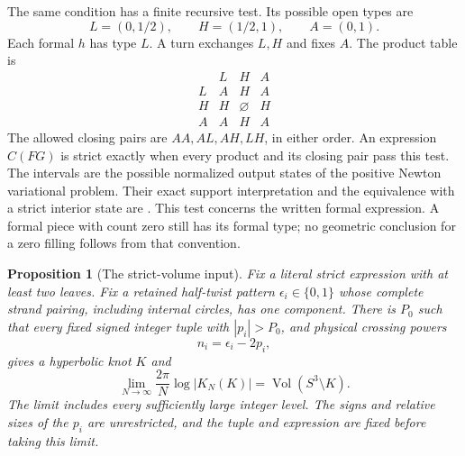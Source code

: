 \documentclass[11pt]{article}
\numberwithin{equation}{section}
\newtheorem{proposition}[theorem]{Proposition}
\theoremstyle{definition}\newtheorem{definition}[theorem]{Definition}
\theoremstyle{remark}\newtheorem{remark}[theorem]{Remark}
\newcommand{\Vol}{\operatorname{Vol}}
\begin{document}
The same condition has a finite recursive test. Its possible open types are
\[
 L=(0,1/2),\qquad H=(1/2,1),\qquad A=(0,1).
\]
Each formal $h$ has type $L$. A turn exchanges $L,H$ and fixes $A$. The product table is
\begin{equation}\label{cr:type-table}
\begin{array}{c|ccc}
 &L&H&A\\\hline
 L&A&H&A\\
 H&H&\varnothing&H\\
 A&A&H&A
\end{array}
\end{equation}
The allowed closing pairs are $AA,AL,AH,LH$, in either order. An expression $C(FG)$ is strict exactly when every product and its closing pair pass this test. The intervals are the possible normalized output states of the positive Newton variational problem. Their exact support interpretation and the equivalence with a strict interior state are \cite[Lemma 5.2 and Theorem 5.5]{Newton}. This test concerns the written formal expression. A formal piece with count zero still has its formal type; no geometric conclusion for a zero filling follows from that convention.

\begin{proposition}[The strict-volume input]\label{cr:import}
Fix a literal strict expression with at least two leaves. Fix a retained half-twist pattern $\epsilon_i\in\{0,1\}$ whose complete strand pairing, including internal circles, has one component. There is $P_0$ such that every fixed signed integer tuple with $|p_i|>P_0$, and physical crossing powers
\begin{equation}\label{cr:power-slope}
                         n_i=\epsilon_i-2p_i,
\end{equation}
gives a hyperbolic knot $K$ and
\begin{equation}\label{cr:volume-limit}
 \lim_{N\to\infty}\frac{2\pi}{N}\log|K_N(K)|
                          =\Vol(S^3\setminus K).
\end{equation}
The limit includes every sufficiently large integer level. The signs and relative sizes of the $p_i$ are unrestricted, and the tuple and expression are fixed before taking this limit.
\end{proposition}
\end{document}

